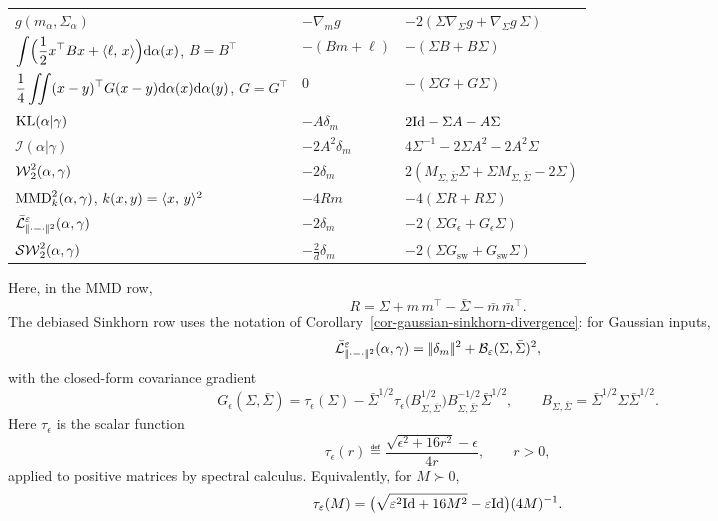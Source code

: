 \begin{prop}
\begin{center}
\begin{tabularx}{\linewidth}{>{\raggedright\arraybackslash}p{.42\linewidth}>{\centering\arraybackslash}p{.18\linewidth}>{\raggedright\arraybackslash}X}
			\hline
			\(g(m_\alpha,\Sigma_\alpha)\)
			&
			\(-\nabla_m g\)
			&
			\(-2(\Sigma\nabla_\Sigma g+\nabla_\Sigma g\,\Sigma)\)
			\\
			\(\displaystyle \int\Bigl(\frac12x^\top Bx+\langle \ell,\,x\rangle\Bigr)\mathrm{d}\alpha(x)\), \(B=B^\top\)
			&
			\(-(B m+\ell)\)
			&
			\(-(\Sigma B+B\Sigma)\)
			\\
			\(\displaystyle \frac14\iint (x-y)^\top G(x-y)\mathrm{d}\alpha(x)\mathrm{d}\alpha(y)\), \(G=G^\top\)
			&
			\(0\)
			&
			\(-(\Sigma G+G\Sigma)\)
			\\
			\(\operatorname{KL}(\alpha|\gamma)\)
			&
			\(-A\delta_m\)
			&
			\(2\mathrm{Id}-\Sigma A-A\Sigma\)
			\\
			\(\mathcal I(\alpha|\gamma)\)
			&
			\(-2A^2\delta_m\)
			&
			\(4\Sigma^{-1}-2\Sigma A^2-2A^2\Sigma\)
			\\
			\(\operatorname{\mathcal{W}}_2^2(\alpha,\gamma)\)
			&
			\(-2\delta_m\)
			&
			\(2(M_{\Sigma,\bar\Sigma}\Sigma+\Sigma M_{\Sigma,\bar\Sigma}-2\Sigma)\)
			\\
			\(\operatorname{MMD}_k^2(\alpha,\gamma)\), \(k(x,y)=\langle x,\,y\rangle^2\)
			&
			\(-4R m\)
			&
			\(-4(\Sigma R+R\Sigma)\)
			\\
			\(\displaystyle \bar{\mathcal{L}}_{|\!| \cdot-\cdot |\!|^2}^{\varepsilon}(\alpha,\gamma)\)
			&
			\(-2\delta_m\)
			&
			\(-2(\Sigma G_\epsilon+G_\epsilon\Sigma)\)
			\\
			\(\operatorname{\mathcal{SW}}_2^2(\alpha,\gamma)\)
			&
			\(\displaystyle -\frac{2}{d}\delta_m\)
			&
			\(-2(\Sigma G_{\mathrm{sw}}+G_{\mathrm{sw}}\Sigma)\)
			\\
			\hline
		\end{tabularx}
		\endgroup
		\end{center}
		Here, in the MMD row,
	\[
		R=\Sigma+m\,m^\top-\bar\Sigma-\bar m\,\bar m^\top.
	\]
	The debiased Sinkhorn row uses the notation of Corollary~\ref{cor-gaussian-sinkhorn-divergence}: for Gaussian inputs,
	\[
		\bar{\mathcal{L}}_{|\!| \cdot-\cdot |\!|^2}^{\varepsilon}(\alpha,\gamma)
		=
		|\!| \delta_m |\!|^2+\mathcal{B}_\varepsilon(\Sigma,\bar\Sigma)^2,
	\]
	with the closed-form covariance gradient
	\[
		G_\epsilon(\Sigma,\bar\Sigma)
		=
		\tau_\epsilon(\Sigma)
		-
		\bar\Sigma^{1/2}
		\tau_\epsilon\bigl(B_{\Sigma,\bar\Sigma}^{1/2}\bigr)
		B_{\Sigma,\bar\Sigma}^{-1/2}
		\bar\Sigma^{1/2},
		\qquad
		B_{\Sigma,\bar\Sigma}=\bar\Sigma^{1/2}\Sigma\bar\Sigma^{1/2}.
	\]
	Here \(\tau_\epsilon\) is the scalar function
	\[
		\tau_\epsilon(r)
		\eqdef
		\frac{\sqrt{\epsilon^2+16r^2}-\epsilon}{4r},
		\qquad r>0,
	\]
	applied to positive matrices by spectral calculus. Equivalently, for \(M\succ0\),
	\[
		\tau_\varepsilon(M)
		=
		\bigl(\sqrt{\varepsilon^2 \mathrm{Id}+16M^2}-\varepsilon \mathrm{Id}\bigr)(4M)^{-1}.
\]
\end{prop}
